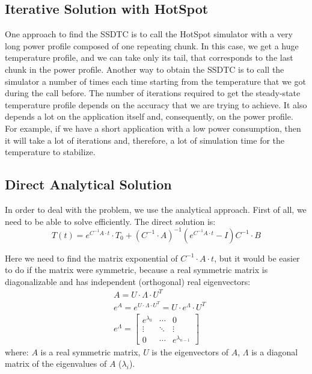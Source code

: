 \subsection{Iterative Solution with HotSpot}
One approach to find the SSDTC is to call the HotSpot simulator with a very long power profile composed of one repeating chunk. In this case, we get a huge temperature profile, and we can take only its tail, that corresponds to the last chunk in the power profile. Another way to obtain the SSDTC is to call the simulator a number of times each time starting from the temperature that we got during the call before. The number of iterations required to get the steady-state temperature profile depends on the accuracy that we are trying to achieve. It also depends a lot on the application itself and, consequently, on the power profile. For example, if we have a short application with a low power consumption, then it will take a lot of iterations and, therefore, a lot of simulation time for the temperature to stabilize.

\subsection{Direct Analytical Solution}
In order to deal with the problem, we use the analytical approach. First of all, we need to be able to solve  efficiently. The direct solution is:
\begin{equation} \label{eq:solution}
  T(t) = e^{C^{-1}A \cdot t} \cdot T_0 + (C^{-1} \cdot A)^{-1}(e^{C^{-1}A \cdot t} - I)C^{-1} \cdot B
\end{equation}

Here we need to find the matrix exponential of $C^{-1} \cdot A \cdot t$, but it would be easier to do if the matrix were symmetric, because a real symmetric matrix is diagonalizable and has independent (orthogonal) real eigenvectors:
\begin{align}
  & A = U \cdot \Lambda \cdot U^T \label{eq:eigenvalue-decomposition} \\
  & e^A = e^{U \cdot \Lambda \cdot U^T} = U \cdot e^{\Lambda} \cdot U^T \nonumber \\
  & e^{\Lambda} = \left[
      \begin{array}{ccc}
        e^{\lambda_0} & \cdots & 0 \\
        \vdots & \ddots & \vdots \\
        0 & \cdots & e^{\lambda_{n - 1}}
      \end{array}
    \right] \nonumber
\end{align}
where: $A$ is a real symmetric matrix, $U$ is the eigenvectors of $A$, $\Lambda$ is a diagonal matrix of the eigenvalues of $A$ ($\lambda_i$).

